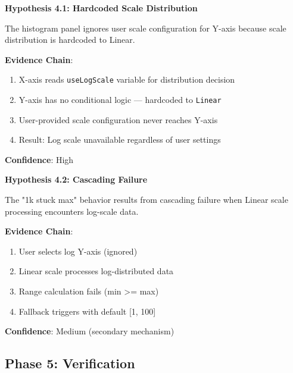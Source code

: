 \documentclass[
    11pt,
    a4paper,
    oneside,
    parskip=full,
    headings=big,
    bibliography=totoc
]{scrartcl}
\newcommand{\code}[1]{\texttt{#1}}
\begin{document}
\begin{actionbox}
    \textbf{Hypothesis 4.1: Hardcoded Scale Distribution}
    
    The histogram panel ignores user scale configuration for Y-axis because 
    scale distribution is hardcoded to Linear.
    
    \vspace{0.3cm}
    \textbf{Evidence Chain}:
    \begin{enumerate}
        \item X-axis reads \code{useLogScale} variable for distribution decision
        \item Y-axis has no conditional logic --- hardcoded to \code{Linear}
        \item User-provided scale configuration never reaches Y-axis
        \item Result: Log scale unavailable regardless of user settings
    \end{enumerate}
    
    \vspace{0.3cm}
    \textbf{Confidence}: High
\end{actionbox}

\begin{actionbox}
    \textbf{Hypothesis 4.2: Cascading Failure}
    
    The "1k stuck max" behavior results from cascading failure when Linear 
    scale processing encounters log-scale data.
    
    \vspace{0.3cm}
    \textbf{Evidence Chain}:
    \begin{enumerate}
        \item User selects log Y-axis (ignored)
        \item Linear scale processes log-distributed data
        \item Range calculation fails (min >= max)
        \item Fallback triggers with default [1, 100]
    \end{enumerate}
    
    \vspace{0.3cm}
    \textbf{Confidence}: Medium (secondary mechanism)
\end{actionbox}

\subsection*{Phase 5: Verification}
\end{document}
